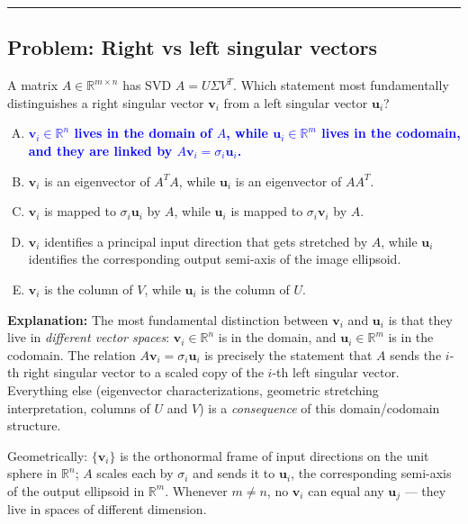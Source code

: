 \documentclass[12pt]{amsart}
\newcommand{\divider}{
  \vspace{-1em}
  \noindent
  \raisebox{-0.15ex}{\textbullet}%
  \hspace{0.5em}%
  \rule[0.5ex]{0.95\textwidth}{1.0pt}%
  \hspace{0.5em}%
  \raisebox{-0.15ex}{\textbullet}%
  \vspace{0em}
}
\begin{document}
\divider

\subsection*{Problem: Right vs left singular vectors}

A matrix $A \in \mathbb{R}^{m \times n}$ has SVD $A = U\Sigma V^T$. Which
statement most fundamentally distinguishes a right singular vector
$\mathbf{v}_i$ from a left singular vector $\mathbf{u}_i$?

\begin{enumerate}[(A)]
\item \textcolor{blue}{\textbf{$\mathbf{v}_i \in \mathbb{R}^n$ lives in the domain of $A$, while $\mathbf{u}_i \in \mathbb{R}^m$ lives in the codomain, and they are linked by $A\mathbf{v}_i = \sigma_i \mathbf{u}_i$.}}
\item $\mathbf{v}_i$ is an eigenvector of $A^TA$, while $\mathbf{u}_i$ is an eigenvector of $AA^T$.
\item $\mathbf{v}_i$ is mapped to $\sigma_i \mathbf{u}_i$ by $A$, while $\mathbf{u}_i$ is mapped to $\sigma_i \mathbf{v}_i$ by $A$.
\item $\mathbf{v}_i$ identifies a principal input direction that gets stretched by $A$, while $\mathbf{u}_i$ identifies the corresponding output semi-axis of the image ellipsoid.
\item $\mathbf{v}_i$ is the column of $V$, while $\mathbf{u}_i$ is the column of $U$.
\end{enumerate}

\textbf{Explanation:}
The most fundamental distinction between $\mathbf{v}_i$ and $\mathbf{u}_i$
is that they live in \emph{different vector spaces}:
$\mathbf{v}_i \in \mathbb{R}^n$ is in the domain, and
$\mathbf{u}_i \in \mathbb{R}^m$ is in the codomain. The relation
$A\mathbf{v}_i = \sigma_i \mathbf{u}_i$ is precisely the statement that
$A$ sends the $i$-th right singular vector to a scaled copy of the $i$-th
left singular vector. Everything else (eigenvector characterizations,
geometric stretching interpretation, columns of $U$ and $V$) is a
\emph{consequence} of this domain/codomain structure.

Geometrically: $\{\mathbf{v}_i\}$ is the orthonormal frame of input
directions on the unit sphere in $\mathbb{R}^n$; $A$ scales each by
$\sigma_i$ and sends it to $\mathbf{u}_i$, the corresponding semi-axis of
the output ellipsoid in $\mathbb{R}^m$. Whenever $m \neq n$, no
$\mathbf{v}_i$ can equal any $\mathbf{u}_j$ --- they live in spaces of
different dimension.
\end{document}
